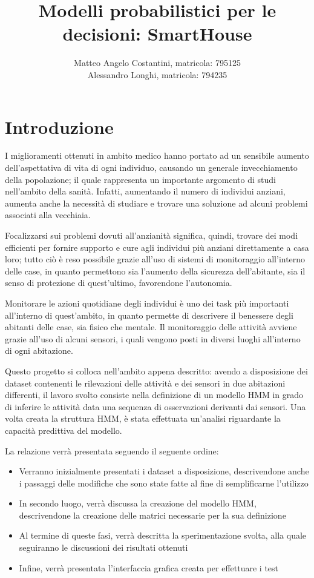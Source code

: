 \documentclass[10pt,a4paper]{article}
\title{Modelli probabilistici per le decisioni: SmartHouse}
\author{Matteo Angelo Costantini, matricola: 795125 \\
	Alessandro Longhi, matricola: 794235}
\date{}
\begin{document}
	\maketitle
	\clearpage
	\tableofcontents
	\clearpage
	\section{Introduzione}
	I miglioramenti ottenuti in ambito medico hanno portato ad un sensibile aumento dell'aspettativa di vita di ogni individuo, causando un generale invecchiamento della popolazione; il quale rappresenta un importante argomento di studi nell'ambito della sanità. Infatti, aumentando il numero di individui anziani, aumenta anche la necessità di studiare e trovare una soluzione ad alcuni problemi associati alla vecchiaia.

	Focalizzarsi sui problemi dovuti all'anzianità significa, quindi, trovare dei modi efficienti per fornire supporto e cure agli individui più anziani direttamente a casa loro; tutto ciò è reso possibile grazie all'uso di sistemi di monitoraggio all'interno delle case, in quanto permettono sia l'aumento della sicurezza dell'abitante, sia il senso di protezione di quest'ultimo, favorendone l'autonomia.

	Monitorare le azioni quotidiane degli individui è uno dei task più importanti all'interno di quest'ambito, in quanto permette di descrivere il benessere degli abitanti delle case, sia fisico che mentale. Il monitoraggio delle attività avviene grazie all'uso di alcuni sensori, i quali vengono posti in diversi luoghi all'interno di ogni abitazione.

	Questo progetto si colloca nell'ambito appena descritto: avendo a disposizione dei dataset contenenti le rilevazioni delle attività e dei sensori in due abitazioni differenti, il lavoro svolto consiste nella definizione di un modello HMM in grado di inferire le attività data una sequenza di osservazioni derivanti dai sensori. Una volta creata la struttura HMM, è stata effettuata un'analisi riguardante la capacità predittiva del modello.

	La relazione verrà presentata seguendo il seguente ordine:
	\begin{itemize}
	    \item Verranno inizialmente presentati i dataset a disposizione, descrivendone anche i passaggi delle modifiche che sono state fatte al fine di semplificarne l'utilizzo
	    \item In secondo luogo, verrà discussa la creazione del modello HMM, descrivendone la creazione delle matrici necessarie per la sua definizione
	    \item Al termine di queste fasi, verrà descritta la sperimentazione svolta, alla quale seguiranno le discussioni dei risultati ottenuti
	    \item Infine, verrà presentata l'interfaccia grafica creata per effettuare i test
	\end{itemize}
\end{document}
